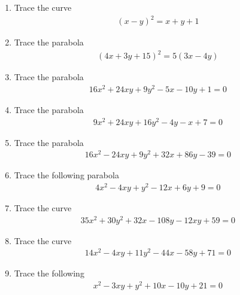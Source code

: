 \renewcommand{\theequation}{\theenumi}
\renewcommand{\thefigure}{\theenumi}
\begin{enumerate}[label=\thesubsection.\arabic*.,ref=\thesubsection.\theenumi]
%
\item 	Trace the curve 
	\begin{align}
	\left(x-y\right)^2 = x+y+1
	\label{eq:solutions/41/2/eq0}
	\end{align}
%
\solution

%
\item Trace the parabola
\begin{align}
    (4x+3y+15)^2=5(3x-4y)
\end{align}
%
\solution

%
\item Trace the parabola
\begin{align}\nonumber
    16x^2+24xy+9y^2-5x-10y+1 = 0
\end{align}
%
\solution

%
\item Trace the parabola
\begin{align}
  9x^2+24xy+16y^2-4y-x+7=0 \label{eq:solutions/41/6/eq:prob}
\end{align}
%
\solution

%
\item Trace the parabola
\begin{align}
   16x^2-24xy+9y^2+32x+86y-39=0 \label{eq:solutions/41/8/eq:given}
\end{align}
%
\solution

\item Trace the following parabola
\begin{align}
    4x^2-4xy+y^2-12x+6y+9=0
\end{align}
%
%
\solution

\item Trace the curve
\begin{align}
35x^2+30y^2+32x-108y-12xy+59=0 \label{eq:solutions/41/ex/given_curve_eq}
\end{align}
%
\solution

\item Trace the curve
\begin{align}
14x^2 - 4xy + 11y^2 - 44x - 58y + 71 =0  \label{eq:solutions/41/ex1/given_curve_eq}
\end{align}

\solution

\item Trace the following 
\begin{align}
    x^2-3xy+y^2+10x-10y+21=0 \label{eq:solutions/41/ex2/eq 1}
\end{align}
%
\solution


\end{enumerate}
